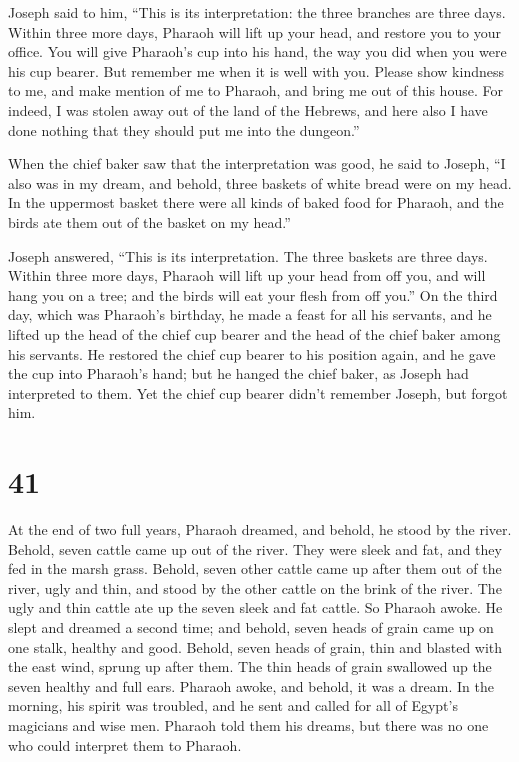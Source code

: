  Joseph said to him, ``This is its interpretation: the
three branches are three days.  Within three more days,
Pharaoh will lift up your head, and restore you to your office. You will
give Pharaoh's cup into his hand, the way you did when you were his cup
bearer.  But remember me when it is well with you. Please
show kindness to me, and make mention of me to Pharaoh, and bring me out
of this house.  For indeed, I was stolen away out of the
land of the Hebrews, and here also I have done nothing that they should
put me into the dungeon.''

 When the chief baker saw that the interpretation was good,
he said to Joseph, ``I also was in my dream, and behold, three baskets
of white bread were on my head.  In the uppermost basket
there were all kinds of baked food for Pharaoh, and the birds ate them
out of the basket on my head.''

 Joseph answered, ``This is its interpretation. The three
baskets are three days.  Within three more days, Pharaoh
will lift up your head from off you, and will hang you on a tree; and
the birds will eat your flesh from off you.''  On the third
day, which was Pharaoh's birthday, he made a feast for all his servants,
and he lifted up the head of the chief cup bearer and the head of the
chief baker among his servants.  He restored the chief cup
bearer to his position again, and he gave the cup into Pharaoh's hand;
 but he hanged the chief baker, as Joseph had interpreted
to them.  Yet the chief cup bearer didn't remember Joseph,
but forgot him.

\hypertarget{section-40}{%
\section{41}\label{section-40}}

 At the end of two full years, Pharaoh dreamed, and behold,
he stood by the river.  Behold, seven cattle came up out of
the river. They were sleek and fat, and they fed in the marsh grass.
 Behold, seven other cattle came up after them out of the
river, ugly and thin, and stood by the other cattle on the brink of the
river.  The ugly and thin cattle ate up the seven sleek and
fat cattle. So Pharaoh awoke.  He slept and dreamed a second
time; and behold, seven heads of grain came up on one stalk, healthy and
good.  Behold, seven heads of grain, thin and blasted with
the east wind, sprung up after them.  The thin heads of
grain swallowed up the seven healthy and full ears. Pharaoh awoke, and
behold, it was a dream.  In the morning, his spirit was
troubled, and he sent and called for all of Egypt's magicians and wise
men. Pharaoh told them his dreams, but there was no one who could
interpret them to Pharaoh.

